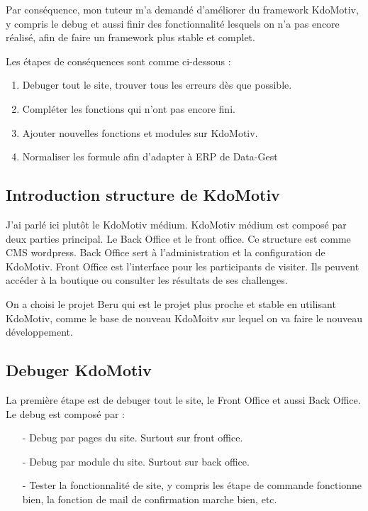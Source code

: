 Par conséquence, mon tuteur m'a demandé d'améliorer du framework KdoMotiv, y compris le debug et aussi finir des fonctionnalité lesquels on n'a pas encore réalisé, afin de faire un framework plus stable et complet.

Les étapes de conséquences sont comme ci-dessous : 
\begin{enumerate}
\item Debuger tout le site, trouver tous les erreurs dès que possible.
\item Compléter les fonctions qui n'ont pas encore fini.
\item Ajouter nouvelles fonctions et modules sur KdoMotiv.
\item Normaliser les formule afin d'adapter à ERP de Data-Gest  
\end{enumerate}

\subsection{Introduction structure de KdoMotiv}
J'ai parlé ici plutôt le KdoMotiv médium. KdoMotiv médium est composé par deux parties principal. Le Back Office et le front office. Ce structure est comme CMS wordpress. Back Office sert à l'administration et la configuration de KdoMotiv. Front Office est l'interface pour les participants de visiter. Ils peuvent accéder à la boutique ou consulter les résultats de ses challenges.

On a choisi le projet Beru qui est le projet plus proche et stable en utilisant KdoMotiv, comme le base de nouveau KdoMoitv sur lequel on va faire le nouveau développement.



\subsection{Debuger KdoMotiv}
La première étape est de debuger tout le site, le Front Office  et aussi Back Office. 
Le debug est composé par :
\begin{itemize}
\item [-] Debug par pages du site. Surtout sur front office.
\item [-] Debug par module du site. Surtout sur back office.
\item [-] Tester la fonctionnalité de site, y compris les étape de commande fonctionne bien, la fonction de mail de confirmation marche bien, etc.
\end{itemize}

